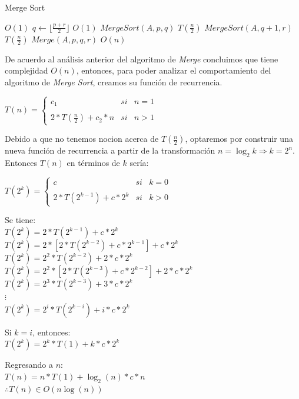 \documentclass[12pt,twoside]{article}
\begin{document}
\begin{algorithm}
  \caption{Merge Sort}
  \begin{algorithmic}[1]
     \Comment $O(1)$
      \State $q \gets \lfloor \frac{p + r}{2} \rfloor$ \Comment $O(1)$
      \State $Merge Sort(A,p,q)$ \Comment $T(\frac{n}{2})$
      \State $Merge Sort(A,q + 1,r)$ \Comment $T(\frac{n}{2})$
      \State $Merge(A,p,q,r)$ \Comment $O(n)$
    \EndIf
  \EndFunction
  \end{algorithmic}
\end{algorithm}

De acuerdo al análisis anterior del algoritmo de \textit{Merge} concluimos que tiene complejidad $O(n)$, entonces, para poder analizar 
el comportamiento del algoritmo de \textit{Merge Sort}, creamos su función de recurrencia.
\newpage
\begin{center}
  $T(n) =\left\{ \begin{array}{lcc}
      c_{1} &   si& n=1\\
  \\  2*T(\frac{n}{2}) + c_{2}*n &  si  & n>1 
  \end{array}
  \right.
  $
\end{center}

Debido a que no tenemos nocion acerca de $T(\frac{n}{2})$, optaremos por construir una nueva función de recurrencia a partir 
de la transformación $n = \log_{2} k \Rightarrow k = 2^n$. Entonces $T(n)$ en términos de $k$ sería:

\begin{center}
  $T(2^k) =\left\{ \begin{array}{lcc}
      c &   si& k=0\\
  \\  2*T(2^{k-1}) + c*2^k &  si  & k>0 
  \end{array}
  \right.
  $
\end{center}

Se tiene:\\

  $T(2^k)=2*T(2^{k-1}) + c*2^k$\\
  $T(2^k)=2*[2*T(2^{k-2}) + c*2^{k-1}] + c*2^k$\\
  $T(2^k)=2^2*T(2^{k-2}) + 2*c*2^k$\\
  $T(2^k)=2^2*[2*T(2^{k-3}) + c*2^{k-2}] + 2*c*2^k$\\
  $T(2^k)=2^3*T(2^{k-3}) + 3*c*2^k$\\
  $\vdots$\\
  $T(2^k)=2^i*T(2^{k-i}) + i*c*2^k$\\ 
  \centerline{}
  Si $k = i$, entonces:\\
  $T(2^k)=2^k*T(1) + k*c*2^k$\\ 
  \centerline{}
  Regresando a $n$:\\
  $T(n)=n*T(1) + \log_{2}(n)*c*n$\\
  $\therefore T(n) \in O(n \log(n))$\\ \\
\end{document}
